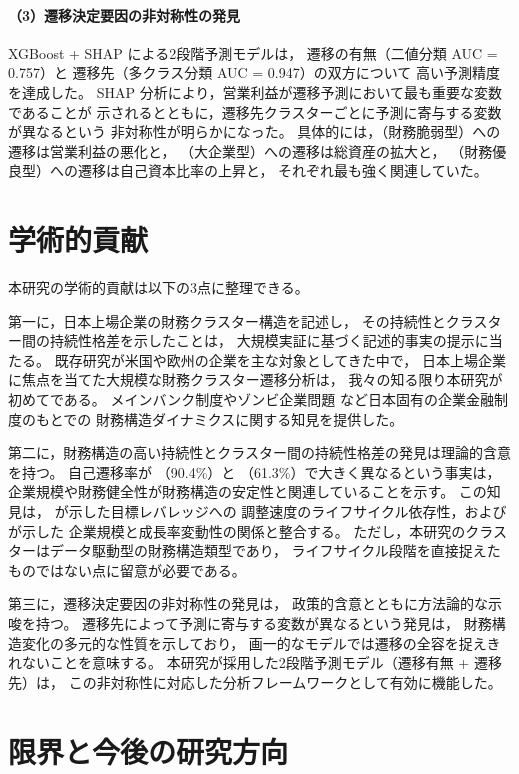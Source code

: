 \paragraph{（3）遷移決定要因の非対称性の発見}
XGBoost + SHAP による2段階予測モデルは，
遷移の有無（二値分類 AUC = 0.757）と
遷移先（多クラス分類 AUC = 0.947）の双方について
高い予測精度を達成した。
SHAP 分析により，営業利益が遷移予測において最も重要な変数であることが
示されるとともに，遷移先クラスターごとに予測に寄与する変数が異なるという
非対称性が明らかになった。
具体的には，（財務脆弱型）への遷移は営業利益の悪化と，
（大企業型）への遷移は総資産の拡大と，
（財務優良型）への遷移は自己資本比率の上昇と，
それぞれ最も強く関連していた。

\section{学術的貢献}
\label{sec:conclusion-contribution}

本研究の学術的貢献は以下の3点に整理できる。

第一に，日本上場企業の財務クラスター構造を記述し，
その持続性とクラスター間の持続性格差を示したことは，
大規模実証に基づく記述的事実の提示に当たる。
既存研究が米国や欧州の企業を主な対象としてきた中で，
日本上場企業に焦点を当てた大規模な財務クラスター遷移分析は，
我々の知る限り本研究が初めてである。
メインバンク制度やゾンビ企業問題
\citep{Caballero2008} など日本固有の企業金融制度のもとでの
財務構造ダイナミクスに関する知見を提供した。

第二に，財務構造の高い持続性とクラスター間の持続性格差の発見は理論的含意を持つ。
自己遷移率が （90.4\%）と （61.3\%）で大きく異なるという事実は，
企業規模や財務健全性が財務構造の安定性と関連していることを示す。
この知見は， が示した目標レバレッジへの
調整速度のライフサイクル依存性，および  が示した
企業規模と成長率変動性の関係と整合する。
ただし，本研究のクラスターはデータ駆動型の財務構造類型であり，
ライフサイクル段階を直接捉えたものではない点に留意が必要である。

第三に，遷移決定要因の非対称性の発見は，
政策的含意とともに方法論的な示唆を持つ。
遷移先によって予測に寄与する変数が異なるという発見は，
財務構造変化の多元的な性質を示しており，
画一的なモデルでは遷移の全容を捉えきれないことを意味する。
本研究が採用した2段階予測モデル（遷移有無 + 遷移先）は，
この非対称性に対応した分析フレームワークとして有効に機能した。

\section{限界と今後の研究方向}
\label{sec:conclusion-limitations}

